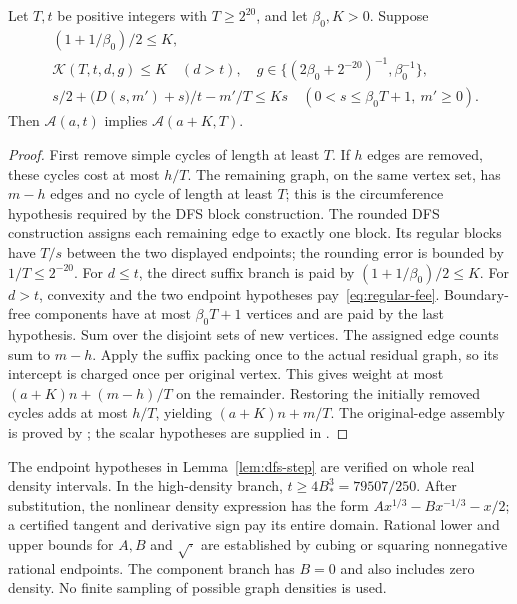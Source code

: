 \begin{lemma}\label{lem:dfs-step}
Let $T,t$ be positive integers with $T\ge2^{20}$, and let $\beta_0,K>0$.
Suppose
\begin{align*}
 &(1+1/\beta_0)/2\le K,\\
 &\mathcal K(T,t,d,g)\le K\quad(d>t),\quad
       g\in\{(2\beta_0+2^{-20})^{-1},\beta_0^{-1}\},\\
 &s/2+\bigl(D(s,m')+s\bigr)/t-m'/T\le Ks
                 \quad(0<s\le\beta_0T+1,\ m'\ge0).
\end{align*}
Then $\mathcal A(a,t)$ implies $\mathcal A(a+K,T)$.
\end{lemma}
\begin{proof}
First remove simple cycles of length at least $T$. If $h$ edges are
removed, these cycles cost at most $h/T$. The remaining graph, on the same
vertex set, has $m-h$ edges and no cycle of length at least $T$; this is the
circumference hypothesis required by the DFS block construction.
The rounded DFS construction assigns each remaining edge to exactly one block.
Its regular blocks have $T/s$ between the two displayed endpoints; the
rounding error is bounded by $1/T\le2^{-20}$. For $d\le t$, the direct
suffix branch is paid by $(1+1/\beta_0)/2\le K$. For $d>t$, convexity
and the two endpoint hypotheses pay~\eqref{eq:regular-fee}. Boundary-free
components have at most $\beta_0T+1$ vertices and are paid by the last
hypothesis. Sum over the disjoint sets of new vertices. The assigned edge
counts sum to $m-h$. Apply the suffix packing once to the actual residual
graph, so its intercept is charged once per original vertex. This gives
weight at most $(a+K)n+(m-h)/T$ on the remainder. Restoring the initially
removed cycles adds at most $h/T$, yielding $(a+K)n+m/T$.
The original-edge assembly is proved by
; the scalar hypotheses are supplied in
.
\end{proof}

The endpoint hypotheses in Lemma~\ref{lem:dfs-step} are verified on whole
real density intervals. In the high-density branch, $t\ge4B_*^3=79507/250$.
After substitution, the nonlinear density expression has the form
$A x^{1/3}-B x^{-1/3}-x/2$; a certified tangent and derivative sign pay its
entire domain. Rational lower and upper bounds for $A,B$ and $\sqrt{\cdot}$
are established by cubing or squaring nonnegative rational endpoints.
The component branch has $B=0$ and also includes zero density.
No finite sampling of possible graph densities is used.

